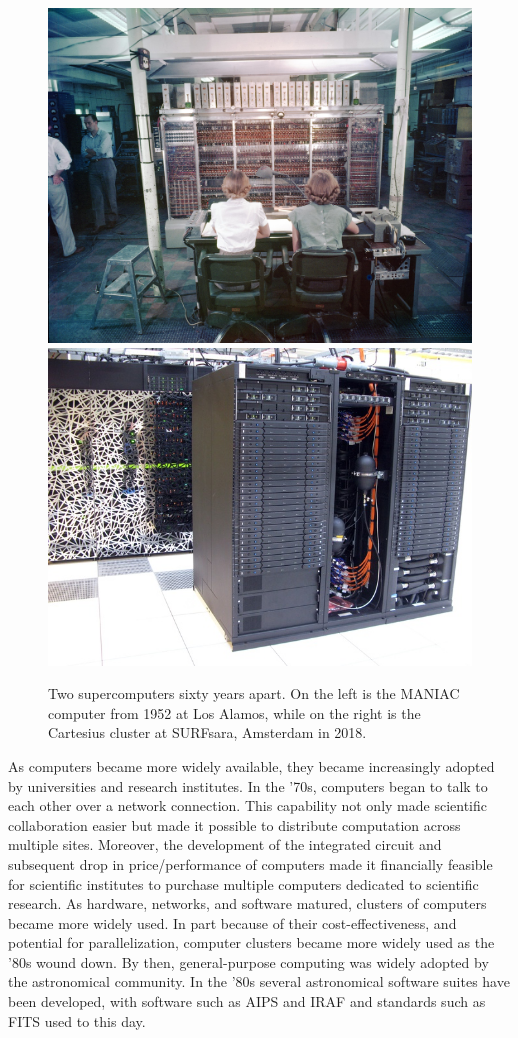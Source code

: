 \begin{figure}[h]
\includegraphics[width=.45\linewidth]{background/figures/Maniac_1952.jpg}\quad\includegraphics[width=.45\linewidth]{background/figures/cartesius.jpeg}
    \caption[Two supercomputers sixty years apart.]{Two supercomputers sixty years apart. On the left is the MANIAC computer from 1952 at Los Alamos, while on the right is the Cartesius cluster at SURFsara, Amsterdam in 2018.}
    \label{fig:intro_supercomputers}

\end{figure}

As computers became more widely available, they became increasingly adopted by universities and research institutes. In the '70s, computers began to talk to each other over a network connection. This capability not only made scientific collaboration easier but made it possible to distribute computation across multiple sites. Moreover, the development of the integrated circuit and subsequent drop in price/performance of computers made it financially feasible for scientific institutes to purchase multiple computers dedicated to scientific research. As hardware, networks, and software matured, clusters of computers became more widely used\citep{tel_2000}. In part because of their cost-effectiveness, and potential for parallelization, computer clusters became more widely used as the '80s wound down. By then, general-purpose computing was widely adopted by the astronomical community. In the '80s several astronomical software suites have been developed, with software such as AIPS\citep{AIPS_NRAO} and IRAF\citep{iraf} and standards such as FITS\citep{1979fits} used to this day. 

